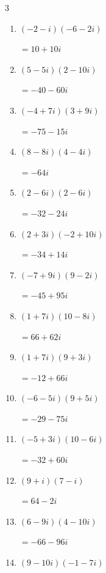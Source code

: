 \begin{multicols}{3}
\begin{enumerate}
  \item $\displaystyle (-2-i)(-6-2i)$

        $\displaystyle =10+10i$

  \item $\displaystyle (5-5i)(2-10i)$

        $\displaystyle =-40-60i$

  \item $\displaystyle (-4+7i)(3+9i)$

        $\displaystyle =-75-15i$

  \item $\displaystyle (8-8i)(4-4i)$

        $\displaystyle =-64i$

  \item $\displaystyle (2-6i)(2-6i)$

        $\displaystyle =-32-24i$

  \item $\displaystyle (2+3i)(-2+10i)$

        $\displaystyle =-34+14i$

  \item $\displaystyle (-7+9i)(9-2i)$

        $\displaystyle =-45+95i$

  \item $\displaystyle (1+7i)(10-8i)$

        $\displaystyle =66+62i$

\columnbreak %

  \item $\displaystyle (1+7i)(9+3i)$

        $\displaystyle =-12+66i$

  \item $\displaystyle (-6-5i)(9+5i)$

        $\displaystyle =-29-75i$

  \item $\displaystyle (-5+3i)(10-6i)$

        $\displaystyle =-32+60i$

  \item $\displaystyle (9+i)(7-i)$

        $\displaystyle =64-2i$

  \item $\displaystyle (6-9i)(4-10i)$

        $\displaystyle =-66-96i$

  \item $\displaystyle (9-10i)(-1-7i)$


\end{enumerate}
\end{multicols}
